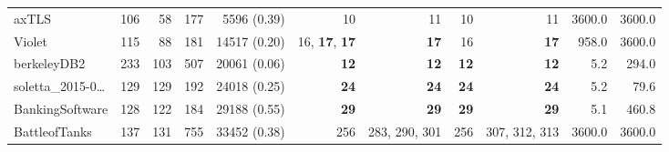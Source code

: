 \begin{table*}
\begin{tiny}
{\begin{tabular}{lrrrrrrrrrr}
axTLS & \num[text-series-to-math=true]{106} & \num[text-series-to-math=true]{58} & \num[text-series-to-math=true]{177} & \num[text-series-to-math=true]{5596} (\num[text-series-to-math=true]{0.39}) & \num[text-series-to-math=true]{10} & \num[text-series-to-math=true]{11} & \num[text-series-to-math=true]{10} & \num[text-series-to-math=true]{11} & 3600.0 & 3600.0\\
Violet & \num[text-series-to-math=true]{115} & \num[text-series-to-math=true]{88} & \num[text-series-to-math=true]{181} & \num[text-series-to-math=true]{14517} (\num[text-series-to-math=true]{0.20}) & \num[text-series-to-math=true]{16}, \textbf{\num[text-series-to-math=true]{17}}, \textbf{\num[text-series-to-math=true]{17}} & \textbf{\num[text-series-to-math=true]{17}} & \num[text-series-to-math=true]{16} & \textbf{\num[text-series-to-math=true]{17}} & 958.0 & 3600.0\\
berkeleyDB2 & \num[text-series-to-math=true]{233} & \num[text-series-to-math=true]{103} & \num[text-series-to-math=true]{507} & \num[text-series-to-math=true]{20061} (\num[text-series-to-math=true]{0.06}) & \textbf{\num[text-series-to-math=true]{12}} & \textbf{\num[text-series-to-math=true]{12}} & \textbf{\num[text-series-to-math=true]{12}} & \textbf{\num[text-series-to-math=true]{12}} & 5.2 & 294.0\\
soletta\_2015-0\ldots & \num[text-series-to-math=true]{129} & \num[text-series-to-math=true]{129} & \num[text-series-to-math=true]{192} & \num[text-series-to-math=true]{24018} (\num[text-series-to-math=true]{0.25}) & \textbf{\num[text-series-to-math=true]{24}} & \textbf{\num[text-series-to-math=true]{24}} & \textbf{\num[text-series-to-math=true]{24}} & \textbf{\num[text-series-to-math=true]{24}} & 5.2 & 79.6\\
BankingSoftware & \num[text-series-to-math=true]{128} & \num[text-series-to-math=true]{122} & \num[text-series-to-math=true]{184} & \num[text-series-to-math=true]{29188} (\num[text-series-to-math=true]{0.55}) & \textbf{\num[text-series-to-math=true]{29}} & \textbf{\num[text-series-to-math=true]{29}} & \textbf{\num[text-series-to-math=true]{29}} & \textbf{\num[text-series-to-math=true]{29}} & 5.1 & 460.8\\
BattleofTanks & \num[text-series-to-math=true]{137} & \num[text-series-to-math=true]{131} & \num[text-series-to-math=true]{755} & \num[text-series-to-math=true]{33452} (\num[text-series-to-math=true]{0.38}) & \num[text-series-to-math=true]{256} & \num[text-series-to-math=true]{283}, \num[text-series-to-math=true]{290}, \num[text-series-to-math=true]{301} & \num[text-series-to-math=true]{256} & \num[text-series-to-math=true]{307}, \num[text-series-to-math=true]{312}, \num[text-series-to-math=true]{313} & 3600.0 & 3600.0\\

\end{tabular}}
\end{tiny}
\end{table*}
